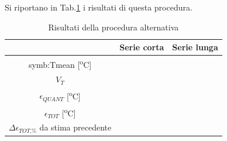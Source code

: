 Si riportano in Tab.\ref{tab:alternativa} i risultati di questa procedura. 

\begin{table}[H]
	\centering
	\begin{tabular}{c|c|c}
		\toprule
		\toprule
		& \textbf{Serie corta} & \textbf{Serie lunga}\\
		\midrule
		\gls{symb:Tmean} [\textsuperscript{o}C]&  & \\
		\midrule
		$V_{\overline{T}} $& & \\
		\midrule
		$\epsilon_{\textit{QUANT}}$ [\textsuperscript{o}C]& & \\
		\midrule
		
		$\epsilon_{\textit{TOT}}$ [\textsuperscript{o}C]& & \\
		\midrule
		$\Delta \epsilon_{\textit{TOT,\%}}$ da stima precedente & & \\
		\bottomrule
		\bottomrule
	\end{tabular}
	\caption{Risultati della procedura alternativa}
	\label{tab:alternativa}
\end{table}